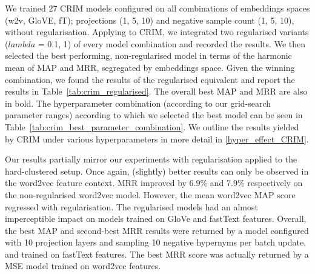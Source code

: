 We trained 27 CRIM models configured on all combinations of embeddings spaces (w2v, GloVE, fT); projections (1, 5, 10) and negative sample count (1, 5, 10), without regularisation.  Applying \citep{ustalov2017negative} to CRIM, we integrated two regularised variants ($lambda$ = 0.1, 1) of every model combination and recorded the results.  We then selected the best performing, non-regularised model in terms of the harmonic mean of \ac{MAP} and \ac{MRR}, segregated by embeddings space.  Given the winning combination, we found the results of the regularised equivalent and report the results in Table~\ref{tab:crim_regularised}.  The overall best \ac{MAP} and \ac{MRR} are also in bold.  The hyperparameter combination (according to our grid-search parameter ranges) according to which we selected the best model can be seen in Table~\ref{tab:crim_best_parameter_combination}.  We outline the results yielded by CRIM under various hyperparameters in more detail in \cref{hyper_effect_CRIM}.

Our results partially mirror our experiments with regularisation applied to the hard-clustered setup.  Once again, (slightly) better results can only be observed in the word2vec feature context.  \ac{MRR} improved by 6.9\% and 7.9\% respectively on the non-regularised word2vec model.  However, the mean word2vec \ac{MAP} score regressed with regularisation.  The regularised models had an almost imperceptible impact on models trained on GloVe and fastText features.  Overall, the best \ac{MAP} and second-best \ac{MRR} results were returned by a model configured with 10 projection layers and sampling 10 negative hypernyms per batch update, and trained on fastText features.  The best \ac{MRR} score was actually returned by a \ac{MSE} model trained on word2vec features.

